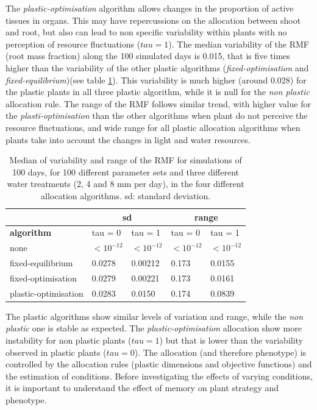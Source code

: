 The \textit{plastic-optimisation} algorithm allows changes in the proportion of active tissues in organs. This may have repercussions on the allocation between shoot and root, but also can lead to non specific variability within plants with no perception of resource fluctuations ($tau = 1$). The median variability of the RMF (root mass fraction) along the 100 simulated days is 0.015, that is five times higher than the variability of the other plastic algorithms (\textit{fixed-optimisation} and \textit{fixed-equilibrium})(see table \ref{table:variability-rmf}). This variability is much higher (around 0.028) for the plastic plants in all three plastic algorithm, while it is null for the \textit{non plastic} allocation rule. The range of the RMF follows similar trend, with higher value for the \textit{plasti-optimisation} than the other algorithms when plant do not perceive the resource fluctuations, and wide range for all plastic allocation algorithms when plants take into account the changes in light and water resources.

\begin{table}[h]
\centering
\caption{Median of variability and range of the RMF for simulations of 100 days, for 100 different parameter sets and three different water treatments (2, 4 and 8 mm per day), in the four different allocation algorithms. sd: standard deviation.}
\label{table:variability-rmf}
\begin{tabular}{l|ll|ll}
            & \multicolumn{2}{c}{\textbf{sd}}              & \multicolumn{2}{c}{\textbf{range}}           \\
\hline
\textbf{algorithm}                     & tau = 0          & tau = 1          & tau = 0          & tau = 1          \\
\hline
none                 & $<10^{-12}$ & $<10^{-12}$ & $<10^{-12}$ & $<10^{-12}$ \\
fixed-equilibrium    & 0.0278           & 0.00212          & 0.173            & 0.0155           \\
fixed-optimisation   & 0.0279           & 0.00221          & 0.173            & 0.0161           \\
plastic-optimisation & 0.0283           & 0.0150           & 0.174            & 0.0839          
\end{tabular}
\end{table}

The plastic algorithms show similar levels of variation and range, while the \textit{non plastic} one is stable as expected. The \textit{plastic-optimisation} allocation show more instability for non plastic plants ($tau = 1$) but that is lower than the variability observed in plastic plants ($tau = 0$). The allocation (and therefore phenotype) is controlled by the allocation rules (plastic dimensions and objective functions) and the estimation of conditions. Before investigating the effects of varying conditions, it is important to understand the effect of memory on plant strategy and phenotype.

